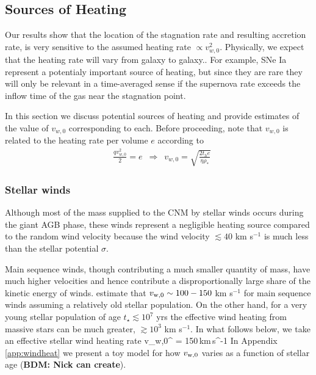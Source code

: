 \documentclass[usenatbib,fleqn]{mn2e}
\newcommand{\rhostar}{\rho_*}
\newcommand{\vwO}{v_{w,0}}
\begin{document}
\subsection{Sources of Heating}
\label{sec:heating}

Our results show that the location of the stagnation rate and resulting accretion rate, is very sensitive to the assumed heating
rate $\propto v_{w,0}^{2}$.  Physically, we expect that the heating rate will vary from galaxy to galaxy.. For example, SNe Ia represent a
potentialy important source of heating, but since they are rare they
will only be relevant in a time-averaged sense if the supernova rate
exceeds the inflow time of the gas near the stagnation point.

In this section we discuss potential sources of heating and provide estimates of the value of $\vwO$ corresponding to each.  Before proceeding, note that $\vwO$ is related to the heating rate per volume $e$ according to 
\begin{align}
  &\frac{q \vwO^2}{2}=e \,\,\,\Rightarrow\,\,\,\vwO = \sqrt{\frac{2 t_h e}{\eta \rhostar}}
  \label{eq:vw_eff}
\end{align}

\subsubsection{Stellar winds} Although most of the mass supplied to the CNM by stellar winds occurs during the giant AGB phase, these winds represent a negligible heating source compared to the random wind velocity because the wind velocity $\lesssim 40$ km s$^{-1}$ is much less than the stellar potential $\sigma$.

Main sequence winds, though contributing a much smaller quantity of mass, have much higher velocities and hence contribute a
disproportionally large share of the kinetic energy of winds.  \citet{NaimanSoares-Furtado+:2013a} estimate that $v_{\rm w,0} \sim 100-150$ km s$^{-1}$ for main sequence winds assuming a relatively old stellar population.  On the other hand, for a very young stellar population of age $t_{\star} \lesssim 10^{7}$ yrs the effective wind heating from massive stars can be much greater, $\gtrsim 10^{3}$ km s$^{-1}$.  In what follows below, we take an effective stellar wind heating rate
\be
v_{\rm w,0}^{\star} =  150\,{\rm km\,s^{-1}}
\ee
In Appendix \ref{app:windheat} we present a toy model for how $v_{\rm w,0}$ varies as a function of stellar age ({\bf BDM: Nick can create}).
\end{document}
